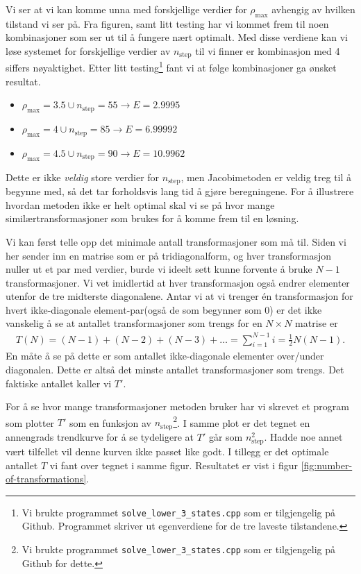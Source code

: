 \documentclass[11pt]{article}
\begin{document}
Vi ser at vi kan komme unna med forskjellige verdier for
$\rho_\text{max}$ avhengig av hvilken tilstand vi ser på. Fra figuren,
samt litt testing har vi kommet frem til noen kombinasjoner som ser
ut til å fungere nært optimalt. Med disse verdiene kan vi løse
systemet for forskjellige verdier av $n_\text{step}$ til vi finner er kombinasjon med 4 siffers
nøyaktighet. Etter litt testing\footnote{Vi brukte programmet
  \texttt{solve\_lower\_3\_states.cpp} som er tilgjengelig på Github. Programmet skriver ut egenverdiene for de tre laveste
  tilstandene.} fant vi at følge kombinasjoner ga ønsket resultat. 
\begin{itemize}
  \item[] { $\rho_\text{max} = 3.5 \cup n_\text{step}=55\rightarrow E = 2.9995$}
  \item[] { $\rho_\text{max} = 4   \cup n_\text{step}=85\rightarrow E = 6.99992$}
  \item[] { $\rho_\text{max} = 4.5 \cup n_\text{step}=90\rightarrow E = 10.9962$}
\end{itemize}

Dette er ikke \emph{veldig} store verdier for $n_\text{step}$, men
Jacobimetoden er veldig treg til å begynne med, så det tar forholdsvis
lang tid å gjøre beregningene. For å illustrere hvordan metoden ikke er
helt optimal skal vi se på hvor mange similærtransformasjoner som
brukes for å komme frem til en løsning.

Vi kan først telle opp det minimale antall transformasjoner som må
til. Siden vi her sender inn en matrise som er på tridiagonalform, og
hver transformasjon nuller ut et par med verdier, burde vi ideelt sett kunne
forvente å bruke $N-1$ transformasjoner. Vi vet imidlertid at hver 
transformasjon også endrer elementer utenfor de tre midterste diagonalene.
Antar vi at vi trenger én transformasjon for hvert ikke-diagonale element-par(også de som begynner som 0) er det ikke
vanskelig å se at antallet transformasjoner som trengs for en $N \times N$ 
matrise er
\begin{align*}
  T(N) = (N-1) + (N-2) + (N-3) + \dots = \sum_{i=1}^{N-1}i = \frac{ 1 }{ 2 }N(N-1).
\end{align*}
En måte å se på dette er som antallet ikke-diagonale elementer
over/under diagonalen. Dette er altså det minste antallet
transformasjoner som trengs. Det faktiske antallet kaller vi $T'$.

For å se hvor mange transformasjoner metoden bruker har vi skrevet et
program som plotter $T'$ som en funksjon av $n_\text{step}$\footnote{Vi brukte programmet
  \texttt{solve\_lower\_3\_states.cpp} som er tilgjengelig på Github for
  dette.}. I samme plot er det tegnet en annengrads trendkurve for å
se tydeligere at $T'$ går som $n_\text{step}^2$. Hadde noe annet
vært tilfellet vil denne kurven ikke passet like godt. I tillegg er
det optimale antallet $T$ vi fant over tegnet i samme figur. Resultatet er vist i
figur \ref{fig:number-of-transformations}. 
\end{document}
